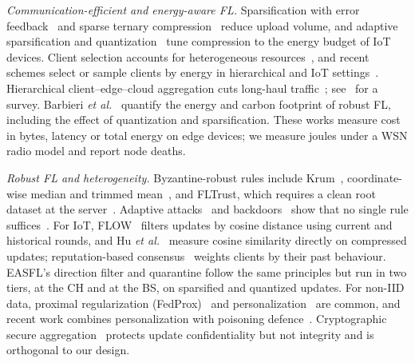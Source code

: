 \documentclass[journal]{IEEEtran}
\begin{document}
\textit{Communication-efficient and energy-aware FL.} Sparsification with error feedback~\cite{lin2018dgc,stich2018} and sparse ternary compression~\cite{sattler2020} reduce upload volume, and adaptive sparsification and quantization~\cite{marnissi2024,compaore2025,zhu2025} tune compression to the energy budget of IoT devices. Client selection accounts for heterogeneous resources~\cite{nishio2019}, and recent schemes select or sample clients by energy in hierarchical and IoT settings~\cite{trindade2024,trindade2026,yang2025symbiotic}. Hierarchical client--edge--cloud aggregation cuts long-haul traffic~\cite{liu2020hfl}; see~\cite{yan2024survey} for a survey. Barbieri \textit{et al.}~\cite{barbieri2025} quantify the energy and carbon footprint of robust FL, including the effect of quantization and sparsification. These works measure cost in bytes, latency or total energy on edge devices; we measure joules under a WSN radio model and report node deaths.

\textit{Robust FL and heterogeneity.} Byzantine-robust rules include Krum~\cite{blanchard2017}, coordinate-wise median and trimmed mean~\cite{yin2018}, and FLTrust, which requires a clean root dataset at the server~\cite{cao2021}. Adaptive attacks~\cite{fang2020} and backdoors~\cite{bagdasaryan2020} show that no single rule suffices~\cite{uddin2025}. For IoT, FLOW~\cite{liu2024flow} filters updates by cosine distance using current and historical rounds, and Hu \textit{et al.}~\cite{hu2024} measure cosine similarity directly on compressed updates; reputation-based consensus~\cite{rashid2025} weights clients by their past behaviour. EASFL's direction filter and quarantine follow the same principles but run in two tiers, at the CH and at the BS, on sparsified and quantized updates. For non-IID data, proximal regularization (FedProx)~\cite{li2020fedprox} and personalization~\cite{arivazhagan2019,tan2023} are common, and recent work combines personalization with poisoning defence~\cite{cao2024,thein2024,sun2025}. Cryptographic secure aggregation~\cite{bonawitz2017} protects update confidentiality but not integrity and is orthogonal to our design. 
\end{document}

